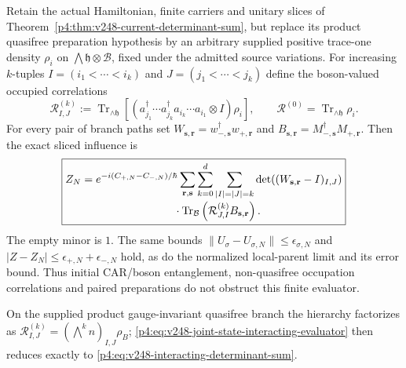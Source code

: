 \documentclass[12pt,a4paper]{article}
\begin{document}
\begin{corollary}
\label{p4:cor:v248-joint-state-interacting-determinants}
Retain the actual Hamiltonian, finite carriers and unitary slices of
Theorem~\ref{p4:thm:v248-current-determinant-sum}, but replace its product
quasifree preparation hypothesis by an arbitrary supplied positive
trace-one density $\rho_i$ on
$\bigwedge\mathfrak h\otimes\mathcal B$, fixed under the admitted source
variations. For increasing $k$-tuples $I=(i_1<\cdots<i_k)$ and
$J=(j_1<\cdots<j_k)$ define the boson-valued occupied correlations
\[
 \mathcal R^{(k)}_{I,J}
 :=\operatorname{Tr}_{\wedge\mathfrak h}
 \!\left[\left(a_{j_1}^\dagger\cdots a_{j_k}^\dagger
                 a_{i_k}\cdots a_{i_1}\otimes I\right)\rho_i\right],
 \qquad
 \mathcal R^{(0)}=\operatorname{Tr}_{\wedge\mathfrak h}\rho_i.
\]
For every pair of branch paths set
$W_{\mathbf s,\mathbf r}=w_{-,\mathbf s}^\dagger w_{+,\mathbf r}$ and
$B_{\mathbf s,\mathbf r}=M_{-,\mathbf s}^\dagger M_{+,\mathbf r}$.
Then the exact sliced influence is
\begin{equation}
\boxed{\begin{aligned}
 Z_N={}&e^{-i(C_{+,N}-C_{-,N})/\hbar}
 \sum_{\mathbf r,\mathbf s}\sum_{k=0}^d\sum_{|I|=|J|=k}
 \det\!\left((W_{\mathbf s,\mathbf r}-I)_{I,J}\right)\\[-2pt]
 &\hspace{25mm}\cdot
 \operatorname{Tr}_{\mathcal B}
       \left(\mathcal R^{(k)}_{J,I}B_{\mathbf s,\mathbf r}\right).
\end{aligned}}
\label{p4:eq:v248-joint-state-interacting-evaluator}
\end{equation}
The empty minor is $1$. The same bounds
$\|U_\sigma-U_{\sigma,N}\|\le\epsilon_{\sigma,N}$ and
$|Z-Z_N|\le\epsilon_{+,N}+\epsilon_{-,N}$ hold, as do the normalized
local-parent limit and its error bound. Thus initial CAR/boson entanglement,
non-quasifree occupation correlations and paired preparations do not
obstruct this finite evaluator.

On the supplied product gauge-invariant quasifree branch the hierarchy
factorizes as
$\mathcal R^{(k)}_{I,J}=(\bigwedge^k n)_{I,J}\rho_B$;
\eqref{p4:eq:v248-joint-state-interacting-evaluator} then reduces exactly
to \eqref{p4:eq:v248-interacting-determinant-sum}.
\end{corollary}
\end{document}
